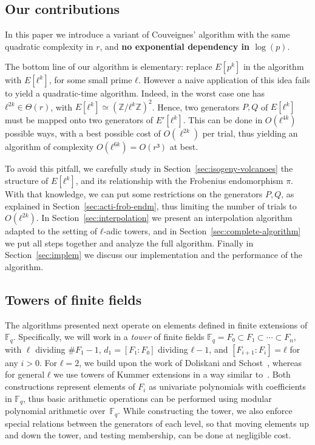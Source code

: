 \documentclass{lms}
\newcommand{\F}{\mathbb{F}}
\begin{document}
\subsection{Our contributions}

In this paper we
introduce a variant of Couveignes' algorithm with the same quadratic
complexity in $r$, and \textbf{no exponential dependency in $\log(p)$}.

The bottom line of our algorithm is elementary: replace $E[p^k]$ in
the algorithm with $E[ℓ^k]$, for some small prime $ℓ$. However a
naive application of this idea fails to yield a quadratic-time
algorithm. Indeed, in the worst case one has $ℓ^{2k}∈\Theta(r)$, with
$E[ℓ^k]≃(ℤ/ℓ^kℤ)^2$. Hence, two generators $P,Q$ of $E[ℓ^k]$ must
be mapped onto two generators of $E'[ℓ^k]$. This can be done in
$O(ℓ^{4k})$ possible ways, with a best possible cost of $O(\ell^{2k})$
per trial,
thus yielding an
algorithm of complexity $O(ℓ^{6k})=O(r³)$ at best.

To avoid this pitfall, we carefully study
in Section~\ref{sec:isogeny-volcanoes} the structure of
$E[ℓ^k]$, and its relationship with the Frobenius endomorphism $π$.
With that knowledge, we can put some restrictions on the generators $P,Q$,
as explained in Section~\ref{sec:acti-frob-endm},
thus limiting the number of trials to $O(ℓ^{2k})$.
In Section~\ref{sec:interpolation}
we present an interpolation algorithm adapted to the setting of
$ℓ$-adic towers, and in Section~\ref{sec:complete-algorithm} we put
all steps together and analyze the full algorithm. Finally in
Section~\ref{sec:implem} we discuss our implementation and the
performance of the algorithm.



\subsection{Towers of finite fields}
\label{sub:towers}

The algorithms presented next operate on elements defined in finite
extensions of $\F_q$. Specifically, we will work in a \emph{tower} of finite
fields $\F_q=F₀⊂F₁⊂\cdots⊂F_n$, with $\ell$ dividing $\#F_1-1$, $d_1=[F₁:F₀]$
dividing $ℓ-1$, and $[F_{i+1}:F_i]=ℓ$ for any $i>0$. For $ℓ=2$,
we build upon the work of Doliskani and Schost~\cite{DoSc12}, whereas for
general $ℓ$ we use towers of Kummer extensions in a way similar
to~\cite[\S2]{DeDoSc13}.  Both constructions represent elements of
$F_i$ as univariate polynomials with coefficients in $\F_q$, thus
basic arithmetic operations can be performed using modular
polynomial arithmetic over~$\F_q$. While constructing the tower, we also enforce
special relations between the generators of each level, so that moving
elements up and down the tower, and testing membership, can be done at
negligible cost.
\end{document}
